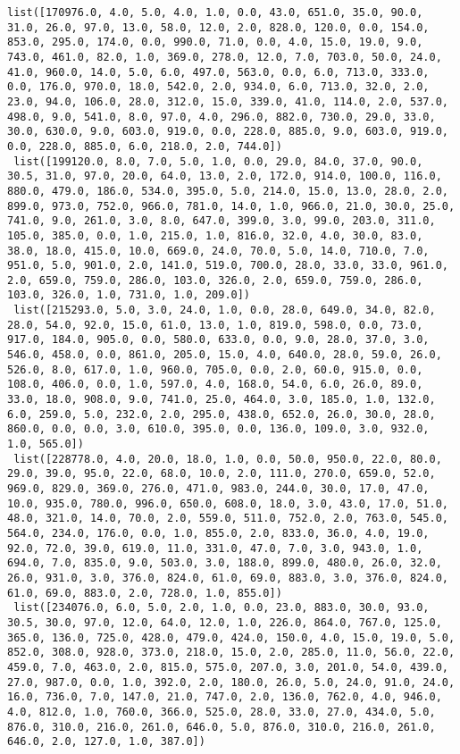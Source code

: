 \documentclass[11pt]{article}
\begin{document}
\begin{Verbatim}[commandchars=\\\{\}]
 list([170976.0, 4.0, 5.0, 4.0, 1.0, 0.0, 43.0, 651.0, 35.0, 90.0, 31.0, 26.0, 97.0, 13.0, 58.0, 12.0, 2.0, 828.0, 120.0, 0.0, 154.0, 853.0, 295.0, 174.0, 0.0, 990.0, 71.0, 0.0, 4.0, 15.0, 19.0, 9.0, 743.0, 461.0, 82.0, 1.0, 369.0, 278.0, 12.0, 7.0, 703.0, 50.0, 24.0, 41.0, 960.0, 14.0, 5.0, 6.0, 497.0, 563.0, 0.0, 6.0, 713.0, 333.0, 0.0, 176.0, 970.0, 18.0, 542.0, 2.0, 934.0, 6.0, 713.0, 32.0, 2.0, 23.0, 94.0, 106.0, 28.0, 312.0, 15.0, 339.0, 41.0, 114.0, 2.0, 537.0, 498.0, 9.0, 541.0, 8.0, 97.0, 4.0, 296.0, 882.0, 730.0, 29.0, 33.0, 30.0, 630.0, 9.0, 603.0, 919.0, 0.0, 228.0, 885.0, 9.0, 603.0, 919.0, 0.0, 228.0, 885.0, 6.0, 218.0, 2.0, 744.0])
 list([199120.0, 8.0, 7.0, 5.0, 1.0, 0.0, 29.0, 84.0, 37.0, 90.0, 30.5, 31.0, 97.0, 20.0, 64.0, 13.0, 2.0, 172.0, 914.0, 100.0, 116.0, 880.0, 479.0, 186.0, 534.0, 395.0, 5.0, 214.0, 15.0, 13.0, 28.0, 2.0, 899.0, 973.0, 752.0, 966.0, 781.0, 14.0, 1.0, 966.0, 21.0, 30.0, 25.0, 741.0, 9.0, 261.0, 3.0, 8.0, 647.0, 399.0, 3.0, 99.0, 203.0, 311.0, 105.0, 385.0, 0.0, 1.0, 215.0, 1.0, 816.0, 32.0, 4.0, 30.0, 83.0, 38.0, 18.0, 415.0, 10.0, 669.0, 24.0, 70.0, 5.0, 14.0, 710.0, 7.0, 951.0, 5.0, 901.0, 2.0, 141.0, 519.0, 700.0, 28.0, 33.0, 33.0, 961.0, 2.0, 659.0, 759.0, 286.0, 103.0, 326.0, 2.0, 659.0, 759.0, 286.0, 103.0, 326.0, 1.0, 731.0, 1.0, 209.0])
 list([215293.0, 5.0, 3.0, 24.0, 1.0, 0.0, 28.0, 649.0, 34.0, 82.0, 28.0, 54.0, 92.0, 15.0, 61.0, 13.0, 1.0, 819.0, 598.0, 0.0, 73.0, 917.0, 184.0, 905.0, 0.0, 580.0, 633.0, 0.0, 9.0, 28.0, 37.0, 3.0, 546.0, 458.0, 0.0, 861.0, 205.0, 15.0, 4.0, 640.0, 28.0, 59.0, 26.0, 526.0, 8.0, 617.0, 1.0, 960.0, 705.0, 0.0, 2.0, 60.0, 915.0, 0.0, 108.0, 406.0, 0.0, 1.0, 597.0, 4.0, 168.0, 54.0, 6.0, 26.0, 89.0, 33.0, 18.0, 908.0, 9.0, 741.0, 25.0, 464.0, 3.0, 185.0, 1.0, 132.0, 6.0, 259.0, 5.0, 232.0, 2.0, 295.0, 438.0, 652.0, 26.0, 30.0, 28.0, 860.0, 0.0, 0.0, 3.0, 610.0, 395.0, 0.0, 136.0, 109.0, 3.0, 932.0, 1.0, 565.0])
 list([228778.0, 4.0, 20.0, 18.0, 1.0, 0.0, 50.0, 950.0, 22.0, 80.0, 29.0, 39.0, 95.0, 22.0, 68.0, 10.0, 2.0, 111.0, 270.0, 659.0, 52.0, 969.0, 829.0, 369.0, 276.0, 471.0, 983.0, 244.0, 30.0, 17.0, 47.0, 10.0, 935.0, 780.0, 996.0, 650.0, 608.0, 18.0, 3.0, 43.0, 17.0, 51.0, 48.0, 321.0, 14.0, 70.0, 2.0, 559.0, 511.0, 752.0, 2.0, 763.0, 545.0, 564.0, 234.0, 176.0, 0.0, 1.0, 855.0, 2.0, 833.0, 36.0, 4.0, 19.0, 92.0, 72.0, 39.0, 619.0, 11.0, 331.0, 47.0, 7.0, 3.0, 943.0, 1.0, 694.0, 7.0, 835.0, 9.0, 503.0, 3.0, 188.0, 899.0, 480.0, 26.0, 32.0, 26.0, 931.0, 3.0, 376.0, 824.0, 61.0, 69.0, 883.0, 3.0, 376.0, 824.0, 61.0, 69.0, 883.0, 2.0, 728.0, 1.0, 855.0])
 list([234076.0, 6.0, 5.0, 2.0, 1.0, 0.0, 23.0, 883.0, 30.0, 93.0, 30.5, 30.0, 97.0, 12.0, 64.0, 12.0, 1.0, 226.0, 864.0, 767.0, 125.0, 365.0, 136.0, 725.0, 428.0, 479.0, 424.0, 150.0, 4.0, 15.0, 19.0, 5.0, 852.0, 308.0, 928.0, 373.0, 218.0, 15.0, 2.0, 285.0, 11.0, 56.0, 22.0, 459.0, 7.0, 463.0, 2.0, 815.0, 575.0, 207.0, 3.0, 201.0, 54.0, 439.0, 27.0, 987.0, 0.0, 1.0, 392.0, 2.0, 180.0, 26.0, 5.0, 24.0, 91.0, 24.0, 16.0, 736.0, 7.0, 147.0, 21.0, 747.0, 2.0, 136.0, 762.0, 4.0, 946.0, 4.0, 812.0, 1.0, 760.0, 366.0, 525.0, 28.0, 33.0, 27.0, 434.0, 5.0, 876.0, 310.0, 216.0, 261.0, 646.0, 5.0, 876.0, 310.0, 216.0, 261.0, 646.0, 2.0, 127.0, 1.0, 387.0])

\end{Verbatim}
\end{document}
